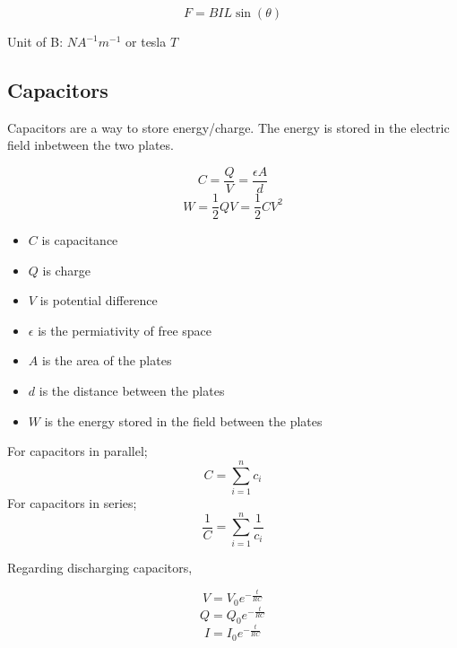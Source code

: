 \documentclass{article}
\begin{document}
\[F=BIL\sin\left(\theta\right)\]

Unit of B: \(NA^{-1}m^{-1}\) or tesla \(T\)

\subsection{Capacitors}


Capacitors are a way to store energy/charge. The energy is stored in the electric field inbetween the two plates.

\[C=\frac{Q}{V}=\frac{\epsilon A}{d}\]
\[W=\frac{1}{2}QV=\frac{1}{2}CV^2\]

\begin{itemize}
	\item $C$ is capacitance
	\item $Q$ is charge
	\item $V$ is potential difference
	\item $\epsilon$ is the permiativity of free space
	\item $A$ is the area of the plates
	\item $d$ is the distance between the plates
	\item $W$ is the energy stored in the field between the plates
\end{itemize}

\noindent For capacitors in parallel;
\[C=\sum_{i=1}^nc_i\]
\noindent For capacitors in series;
\[\frac{1}{C}=\sum_{i=1}^n\frac{1}{c_i}\]

\noindent Regarding discharging capacitors,

\[V=V_0e^{-\frac{t}{RC}}\]
\[Q=Q_0e^{-\frac{t}{RC}}\]
\[I=I_0e^{-\frac{t}{RC}}\]
\end{document}
